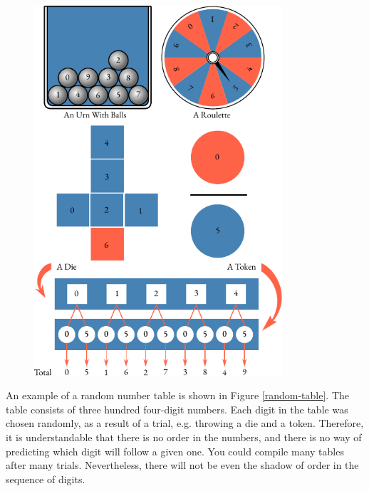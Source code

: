 \begin{figure}[!ht]
 \centering
 \includegraphics[width=0.82\textwidth]{figures/random-generators.pdf}
 \end{figure}
{} An example of a random number table is
shown in Figure \ref{random-table}. The table consists of three hundred four-digit
numbers. Each digit in the table was chosen randomly, as a result of
a trial, e.g. throwing a die and a token. Therefore, it is understandable
that there is no order in the numbers, and there is no way of predicting
which digit will follow a given one. You could compile many tables after
many trials. Nevertheless, there will not be even the shadow of order in
the sequence of digits.

